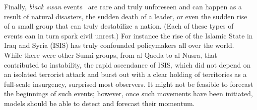 Finally, {\it black swan} events~\cite{taleb-book} are rare and truly unforeseen and can happen as a
result of natural disasters, the sudden death of a leader, or even the sudden rise of a
small group that can truly destabilize a nation.  (Each of these types of
events can in turn spark civil unrest.) For instance the rise of the
Islamic State in Iraq and Syria (ISIS) has truly confounded policymakers all over the world.
While there were other Sunni groups, from al-Qaeda to al-Nusra, that contributed to
instability, the rapid ascendance of ISIS, which did not depend on an isolated terrorist attack and
burst out with a clear holding of territories as a full-scale insurgency, surprised most observers.
It might not be feasible to forecast the beginnings of such events; however, once such movements
have been initiated, models should be able to detect and forecast their momentum.

